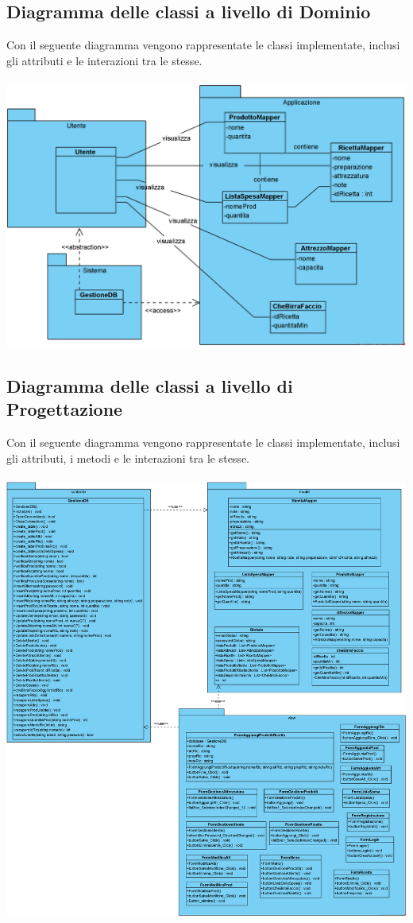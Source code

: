 \documentclass[a4paper, titlepage]{article}
\begin{document}
\subsection{Diagramma delle classi a livello di Dominio}
Con il seguente diagramma vengono rappresentate le classi implementate, inclusi gli attributi e le interazioni tra le stesse. \\\\
\includegraphics[scale=0.50]{Immagini/Domain Model_Brew Day!_definitivo.png}
\subsection{Diagramma delle classi a livello di Progettazione}
Con il seguente diagramma vengono rappresentate le classi implementate, inclusi gli attributi, i metodi e le interazioni tra le stesse. \\\\
\includegraphics[scale=0.40]{Immagini/Design Model_Brew Day!_definitivo.png}
\end{document}
